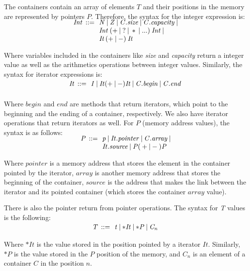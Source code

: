 \documentclass[a4paper]{llncs}
\begin{document}
The containers contain an array of elements $T$ and their 
positions in the memory are represented by pointers $P$.
Therefore, the syntax for the integer expression is:
%
\[\begin{array}{r@{\:\:}c@{\:\:}l}
\\[-5ex]
\mathit{Int}  & ::= & \: \mathit{N} \: | \: \mathit{Z} \: | \: \mathit{C.size} \: | \: \mathit{C.capacity} \: | \\
              &     & \: \mathit{Int} \: ( + \: | \: ? \: | \: * \: | \: ...) \: \mathit{Int}  \: | \\
              &     & \: \textit{It} \: ( + \: | \: - ) \:  \textit{It} 
\end{array}
\]

Where variables included in the containers 
like \emph{size} and \emph{capacity} return 
a integer value as well as the arithmetics 
operations between integer values. 
Similarly, the syntax for iterator 
expressions is:
%
\[\begin{array}{r@{\:\:}c@{\:\:}l}\label{iterator-semantics}
\\[-5ex]
\mathit{It}   & ::= & \: \mathit{I} \: | \: \mathit{It} ( + \: | \: - ) \mathit{It} \: | \: \mathit{C.begin} \: | \: \mathit{C.end} \:  \\
\end{array}
\]

Where $begin$ and $end$ are methods 
that return iterators, which point to the beginning 
and the ending of a container, respectively. We also have 
iterator operations that return iterators as well. 
For $P$ (memory address values), the syntax is as follows:
%	
\[\begin{array}{r@{\:\:}c@{\:\:}l}\label{pointer-semantics}
\\[-5ex]
\mathit{P}  & ::= & \: \mathit{p} \: | \: \mathit{It.pointer} \: | \: \mathit{C.array} \: | \\
            &     & \: \mathit{It.source} \: | \: \mathit{P}  ( \: + \: | \: - \: )  \textit{P} \: \\
\end{array}
\]

Where $pointer$ is a memory address that stores the element 
in the container pointed by the iterator, $array$ is another 
memory address that stores the beginning of the container, 
$source$ is the address that makes the link between the iterator 
and its pointed container (which stores the container $array$ value). 

There is also the pointer return from pointer operations.
The syntax for \emph{T} values is the following: 
%
\[\begin{array}{r@{\:\:}c@{\:\:}l}\label{element-semantics}
\\[-5ex]
\mathit{T}   & ::= & \: \mathit{t} \: | \: \mathit{*It} \: | \: \mathit{*P} \: | \: \mathit{C_n} \:  \\
\end{array}
\]
%
Where $*It$ is the value stored in the position pointed 
by a iterator $It$. Similarly, $*P$ is the value stored 
in the $P$ position of the memory, and $\mathit{C_n}$ is 
an element of a container $C$ in the position $n$.
\end{document}
